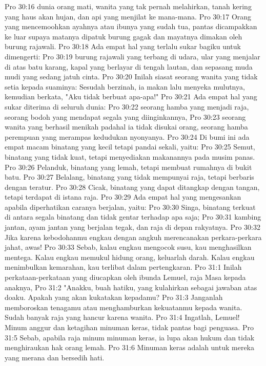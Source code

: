 Pro 30:16  dunia orang mati, wanita yang tak pernah melahirkan, tanah kering yang haus akan hujan, dan api yang menjilat ke mana-mana.
Pro 30:17  Orang yang mencemoohkan ayahnya atau ibunya yang sudah tua, pantas dicampakkan ke luar supaya matanya dipatuk burung gagak dan mayatnya dimakan oleh burung rajawali.
Pro 30:18  Ada empat hal yang terlalu sukar bagiku untuk dimengerti:
Pro 30:19  burung rajawali yang terbang di udara, ular yang menjalar di atas batu karang, kapal yang berlayar di tengah lautan, dan sepasang muda mudi yang sedang jatuh cinta.
Pro 30:20  Inilah siasat seorang wanita yang tidak setia kepada suaminya: Sesudah berzinah, ia makan lalu menyeka mulutnya, kemudian berkata, "Aku tidak berbuat apa-apa!"
Pro 30:21  Ada empat hal yang sukar diterima di seluruh dunia:
Pro 30:22  seorang hamba yang menjadi raja, seorang bodoh yang mendapat segala yang diinginkannya,
Pro 30:23  seorang wanita yang berhasil menikah padahal ia tidak disukai orang, seorang hamba perempuan yang merampas kedudukan nyonyanya.
Pro 30:24  Di bumi ini ada empat macam binatang yang kecil tetapi pandai sekali, yaitu:
Pro 30:25  Semut, binatang yang tidak kuat, tetapi menyediakan makanannya pada musim panas.
Pro 30:26  Pelanduk, binatang yang lemah, tetapi membuat rumahnya di bukit batu.
Pro 30:27  Belalang, binatang yang tidak mempunyai raja, tetapi berbaris dengan teratur.
Pro 30:28  Cicak, binatang yang dapat ditangkap dengan tangan, tetapi terdapat di istana raja.
Pro 30:29  Ada empat hal yang mengesankan apabila diperhatikan caranya berjalan, yaitu:
Pro 30:30  Singa, binatang terkuat di antara segala binatang dan tidak gentar terhadap apa saja;
Pro 30:31  kambing jantan, ayam jantan yang berjalan tegak, dan raja di depan rakyatnya.
Pro 30:32  Jika karena kebodohanmu engkau dengan angkuh merencanakan perkara-perkara jahat, awas!
Pro 30:33  Sebab, kalau engkau mengocok susu, kau menghasilkan mentega. Kalau engkau memukul hidung orang, keluarlah darah. Kalau engkau menimbulkan kemarahan, kau terlibat dalam pertengkaran.
Pro 31:1  Inilah perkataan-perkataan yang diucapkan oleh ibunda Lemuel, raja Masa kepada anaknya,
Pro 31:2  "Anakku, buah hatiku, yang kulahirkan sebagai jawaban atas doaku. Apakah yang akan kukatakan kepadamu?
Pro 31:3  Janganlah memboroskan tenagamu atau menghamburkan kekuatanmu kepada wanita. Sudah banyak raja yang hancur karena wanita.
Pro 31:4  Ingatlah, Lemuel! Minum anggur dan ketagihan minuman keras, tidak pantas bagi penguasa.
Pro 31:5  Sebab, apabila raja minum minuman keras, ia lupa akan hukum dan tidak menghiraukan hak orang lemah.
Pro 31:6  Minuman keras adalah untuk mereka yang merana dan bersedih hati.
